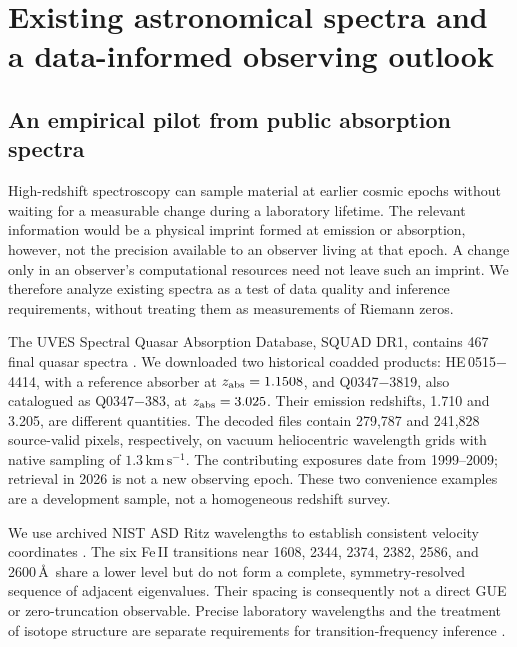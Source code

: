 \section{Existing astronomical spectra and a data-informed observing outlook}
\label{sec:highz}
\subsection{An empirical pilot from public absorption spectra}
High-redshift spectroscopy can sample material at earlier cosmic epochs without waiting for a measurable change during a laboratory lifetime. The relevant information would be a physical imprint formed at emission or absorption, however, not the precision available to an observer living at that epoch. A change only in an observer's computational resources need not leave such an imprint. We therefore analyze existing spectra as a test of data quality and inference requirements, without treating them as measurements of Riemann zeros.

The UVES Spectral Quasar Absorption Database, SQUAD DR1, contains 467 final quasar spectra \cite{Murphy2019SQUAD}. We downloaded two historical coadded products: HE\,0515$-$4414, with a reference absorber at $z_{\rm abs}=1.1508$, and Q0347$-$3819, also catalogued as Q0347$-$383, at $z_{\rm abs}=3.025$. Their emission redshifts, 1.710 and 3.205, are different quantities. The decoded files contain 279,787 and 241,828 source-valid pixels, respectively, on vacuum heliocentric wavelength grids with native sampling of $1.3\,\mathrm{km\,s^{-1}}$. The contributing exposures date from 1999--2009; retrieval in 2026 is not a new observing epoch. These two convenience examples are a development sample, not a homogeneous redshift survey.

We use archived NIST ASD Ritz wavelengths to establish consistent velocity coordinates \cite{NISTASD2024}. The six Fe\,II transitions near 1608, 2344, 2374, 2382, 2586, and 2600\,\AA\ share a lower level but do not form a complete, symmetry-resolved sequence of adjacent eigenvalues. Their spacing is consequently not a direct GUE or zero-truncation observable. Precise laboratory wavelengths and the treatment of isotope structure are separate requirements for transition-frequency inference \cite{MurphyBerengut2014}.

